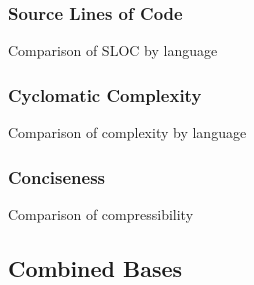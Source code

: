 \subsubsection{Source Lines of Code}

\begin{table}[!htb]

\caption{Comparison of SLOC by language}
\label{table:expr:sloc}
\end{table}

\subsubsection{Cyclomatic Complexity}

\begin{table}[!htb]

\caption{Comparison of complexity by language}
\label{table:expr:cyclomatic}
\end{table}

\subsubsection{Conciseness}

\begin{table}[!htb]

\caption{Comparison of compressibility}
\label{table:expr:compression}
\end{table}

\subsection{Combined Bases}
\label{subsec:combined}
